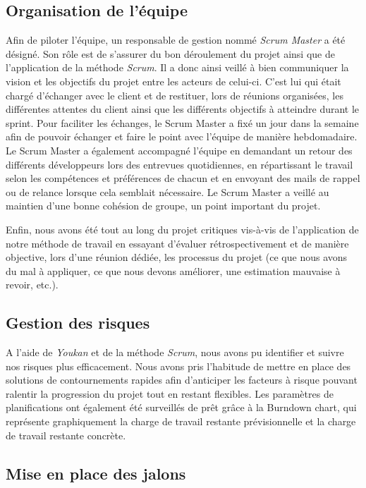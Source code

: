 \subsection{Organisation de l'équipe}

Afin de piloter l'équipe, un responsable de gestion nommé \emph{Scrum Master} a été désigné. Son rôle est de s'assurer du bon déroulement du projet ainsi que de l'application de la méthode \emph{Scrum}. Il a donc ainsi veillé à bien communiquer la vision et les objectifs du projet entre les acteurs de celui-ci. C'est lui qui était chargé d'échanger avec le client et de restituer, lors de réunions organisées, les différentes attentes du client ainsi que les différents objectifs à atteindre durant le sprint. Pour faciliter les échanges, le Scrum Master a fixé un jour dans la semaine afin de pouvoir échanger et faire le point avec l'équipe de manière hebdomadaire. Le Scrum Master a également accompagné l'équipe en demandant un retour des différents développeurs lors des entrevues quotidiennes, en répartissant le travail selon les compétences et préférences de chacun et en envoyant des mails de rappel ou de relance lorsque cela semblait nécessaire. Le Scrum Master a veillé au maintien d'une bonne cohésion de groupe, un point important du projet.

Enfin, nous avons été tout au long du projet critiques vis-à-vis de l'application de notre méthode de travail en essayant d'évaluer rétrospectivement et de manière objective, lors d'une réunion dédiée, les processus du projet (ce que nous avons du mal à appliquer, ce que nous devons améliorer, une estimation mauvaise à revoir, etc.). 

\subsection{Gestion des risques}

A l'aide de \emph{Youkan} et de la méthode \emph{Scrum}, nous avons pu identifier et suivre nos risques plus efficacement. Nous avons pris l'habitude de mettre en place des solutions de contournements rapides afin d'anticiper les facteurs à risque pouvant ralentir la progression du projet tout en restant flexibles.
Les paramètres de planifications ont également été surveillés de prêt grâce à la Burndown chart, qui représente graphiquement la charge de travail restante prévisionnelle et la charge de travail restante concrète.

\subsection{Mise en place des jalons}

